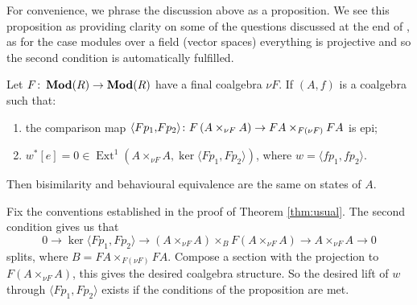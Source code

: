\documentclass[runningheads]{llncs}
\begin{document}
For convenience, we phrase the discussion above as a proposition.
We see this proposition as providing clarity on some of the questions discussed at the end of \cite{bonchi12}, as for the case modules over a field (vector spaces) everything is projective and so the second condition is automatically fulfilled.
\begin{propositionE}
\label{prop:ext}
Let $F \colon \operatorname{\mathbf{Mod}}(R)\to \operatorname{\mathbf{Mod}}(R)$ have a final coalgebra $\nu F$. If $(A, f)$ is a coalgebra such that:
\begin{enumerate}
\item
 the comparison map $\langle Fp_1{, }  Fp_2 \rangle \colon F\left(A\times_{\nu F}A \right)  \to FA\times_{F(\nu F)}FA$ is epi;
 \item
  $w^*[e] = 0 \in \operatorname{Ext}^1(A\times_{\nu F}A , \ker \langle Fp_1{, }  Fp_2 \rangle )$, where $w = \langle f p_1, f p_2\rangle$.
\end{enumerate} 
Then bisimilarity  and behavioural equivalence are the same on states of $A$.
\end{propositionE}
\begin{proofE}
Fix the conventions established in the proof of Theorem \ref{thm:usual}.
The second condition gives us that 
\begin{equation*}
0 \to \ker \langle Fp_1{, }  Fp_2 \rangle \to \left(A\times_{\nu F}A\right) \times_B F(A\times_{\nu F}A ) \to A\times_{\nu F}A   \to 0
\end{equation*} 
splits, where $B= FA\times_{F(\nu F)}FA$.
Compose a section with the projection to $F(A\times_{\nu F}A )$, this gives the desired coalgebra structure.
So the desired lift of $w$ through $\langle Fp_1, Fp_2 \rangle$ exists if the conditions of the proposition are met.
\end{proofE}
\end{document}
